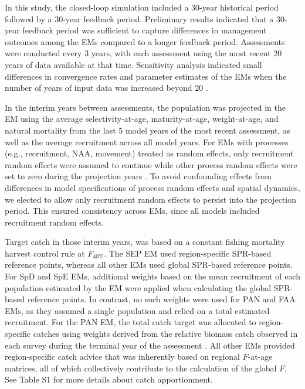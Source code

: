 \documentclass[
  12pt,
]{article}
\begin{document}
In this study, the closed-loop simulation included a 30-year historical
period followed by a 30-year feedback period. Preliminary results
indicated that a 30-year feedback period was sufficient to capture
differences in management outcomes among the EMs compared to a longer
feedback period. Assessments were conducted every 3 years, with each
assessment using the most recent 20 years of data available at that
time. Sensitivity analysis indicated small differences in convergence
rates and parameter estimates of the EMs when the number of years of
input data was increased beyond 20 \citep{Li2018}.

In the interim years between assessments, the population was projected
in the EM using the average selectivity-at-age, maturity-at-age,
weight-at-age, and natural mortality from the last 5 model years of the
most recent assessment, as well as the average recruitment across all
model years. For EMs with processes (e.g., recruitment, NAA, movement)
treated as random effects, only recruitment random effects were assumed
to continue while other process random effects were set to zero during
the projection years \citep{Stock2021a}. To avoid confounding effects
from differences in model specifications of process random effects and
spatial dynamics, we elected to allow only recruitment random effects to
persist into the projection period. This ensured consistency across EMs,
since all models included recruitment random effects.

Target catch in those interim years, was based on a constant fishing
mortality harvest control rule at \(F_{40\%}\). The SEP EM used
region-specific SPR-based reference points, whereas all other EMs used
global SPR-based reference points. For SpD and SpE EMs, additional
weights based on the mean recruitment of each population estimated by
the EM were applied when calculating the global SPR-based reference
points. In contrast, no such weights were used for PAN and FAA EMs, as
they assumed a single population and relied on a total estimated
recruitment. For the PAN EM, the total catch target was allocated to
region-specific catches using weights derived from the relative biomass
catch observed in each survey during the terminal year of the assessment
\citep{Bosley2019}. All other EMs provided region-specific catch advice
that was inherently based on regional \(F\)-at-age matrices, all of
which collectively contribute to the calculation of the global \(F\).
See Table S1 for more details about catch apportionment.
\end{document}
